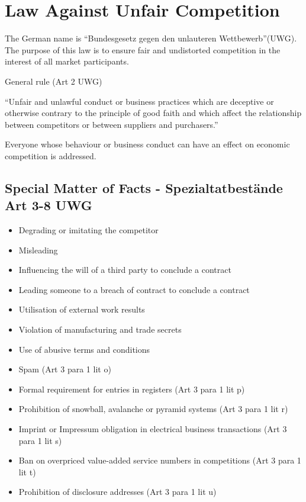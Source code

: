 \documentclass[11pt]{article}
\theoremstyle{definition}
\begin{document}
\section{Law Against Unfair Competition}
The German name is \textquotedblleft Bundesgesetz gegen den unlauteren Wettbewerb\textquotedblright (UWG). The purpose of this law is to ensure fair and undistorted competition in the interest of all market participants.

\begin{definition}
	General rule (Art 2 UWG)
	
	\textquotedblleft Unfair and unlawful conduct or business practices which are deceptive or otherwise contrary to the principle of good faith and which affect the relationship between competitors or between suppliers and purchasers.\textquotedblright
\end{definition}

Everyone whose behaviour or business conduct can have an effect on economic competition is addressed.

\subsection{Special Matter of Facts - Spezialtatbestände Art 3-8 UWG}
\begin{itemize}
	\item Degrading or imitating the competitor
	\item Misleading
	\item Influencing the will of a third party to conclude a contract
	\item Leading someone to a breach of contract to conclude a contract
	\item Utilisation of external work results
	\item Violation of manufacturing and trade secrets
	\item Use of abusive terms and conditions
	\item Spam (Art 3 para 1 lit o)
	\item Formal requirement for entries in registers (Art 3 para 1 lit p)
	\item Prohibition of snowball, avalanche or pyramid systems (Art 3 para 1 lit r)
	\item Imprint or Impressum obligation in electrical business transactions (Art 3 para 1 lit s)
	\item Ban on overpriced value-added service numbers in competitions (Art 3 para 1 lit t)
	\item Prohibition of disclosure addresses (Art 3 para 1 lit u)
\end{itemize}
\end{document}
